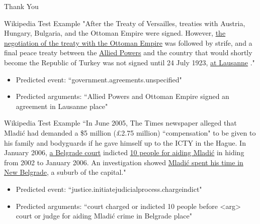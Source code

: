 \documentclass[10pt,aspectratio=1610,professionalfont]{beamer}
\begin{document}
\begin{frame}[standout]
    Thank You
\end{frame}

\begin{frame}[noframenumbering]{Wikipedia Test Example}
    "After the Treaty of Versailles, treaties with Austria, Hungary, Bulgaria, and the Ottoman Empire were signed. However, \underline{the negotiation of the treaty with the Ottoman Empire} was followed by strife, and a final peace treaty between the \underline{Allied Powers} and the country that would shortly become the Republic of Turkey was not signed until 24 July 1923, \underline{at Lausanne} ."
    \begin{itemize}
        \item Predicted event: “government.agreements.unspecified"
        \item Predicted arguments: “Allied Powers and Ottoman Empire signed an agreement in Lausanne place"
    \end{itemize}
\end{frame}

\begin{frame}[noframenumbering]{Wikipedia Test Example}
    “In June 2005, The Times newspaper alleged that Mladić had demanded a \$5 million (£2.75 million) “compensation" to be given to his family and bodyguards if he gave himself up to the ICTY in the Hague. In January 2006, \underline{a Belgrade court} indicted \underline{10 people for aiding Mladić} in hiding from 2002 to January 2006. An investigation showed \underline{Mladić spent his time in New Belgrade}, a suburb of the capital."

    \begin{itemize}
        \item Predicted event: “justice.initiatejudicialprocess.chargeindict"
        \item Predicted arguments: “court charged or indicted 10 people before  <arg>  court or judge for aiding Mladić crime in Belgrade place"
    \end{itemize}
\end{frame}
\end{document}
